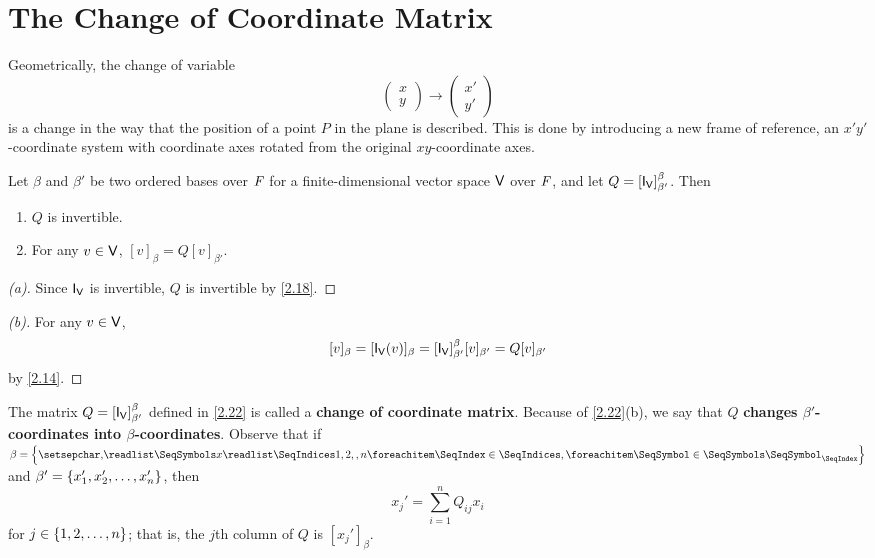 \section{The Change of Coordinate Matrix}\label{sec:2.5}

\begin{note}
  Geometrically, the change of variable
  \[
    \begin{pmatrix}
      x \\
      y
    \end{pmatrix} \to \begin{pmatrix}
      x' \\
      y'
    \end{pmatrix}
  \]
  is a change in the way that the position of a point \(P\) in the plane is described.
  This is done by introducing a new frame of reference, an \(x' y'\)-coordinate system with coordinate axes rotated from the original \(xy\)-coordinate axes.
\end{note}

\begin{thm}\label{2.22}
  Let \(\beta\) and \(\beta'\) be two ordered bases over \(\mathit{F}\) for a finite-dimensional vector space \(\mathsf{V}\) over \(\mathit{F}\), and let \(Q = [\IT[\V]]_{\beta'}^{\beta}\).
  Then
  \begin{enumerate}
    \item \(Q\) is invertible.
    \item For any \(v \in \mathsf{V}\), \([v]_{\beta} = Q [v]_{\beta'}\).
  \end{enumerate}
\end{thm}

\begin{proof}[(a)]
  Since \(\IT[\V]\) is invertible, \(Q\) is invertible by \cref{2.18}.
\end{proof}

\begin{proof}[(b)]
  For any \(v \in \mathsf{V}\),
  \[
    [v]_{\beta} = [\IT[\V](v)]_{\beta} = [\IT[\V]]_{\beta'}^{\beta} [v]_{\beta'} = Q [v]_{\beta'}
  \]
  by \cref{2.14}.
\end{proof}

\begin{defn}\label{2.5.1}
  The matrix \(Q = [\IT[\V]]_{\beta'}^{\beta}\) defined in \cref{2.22} is called a \textbf{change of coordinate matrix}.
  Because of \cref{2.22}(b), we say that \(Q\) \textbf{changes \(\beta'\)-coordinates into \(\beta\)-coordinates}.
  Observe that if \(\beta = \set{\seq{x}{1,2,,n}}\) and \(\beta' = \left\lbrace x_1', x_2', \dots, x_n'\right\rbrace\), then
  \[
    x_j' = \sum_{i = 1}^n Q_{i j} x_i
  \]
  for \(j \in \left\lbrace1, 2, \dots, n\right\rbrace\);
  that is, the \(j\)th column of \(Q\) is \([x_j']_{\beta}\).
\end{defn}

